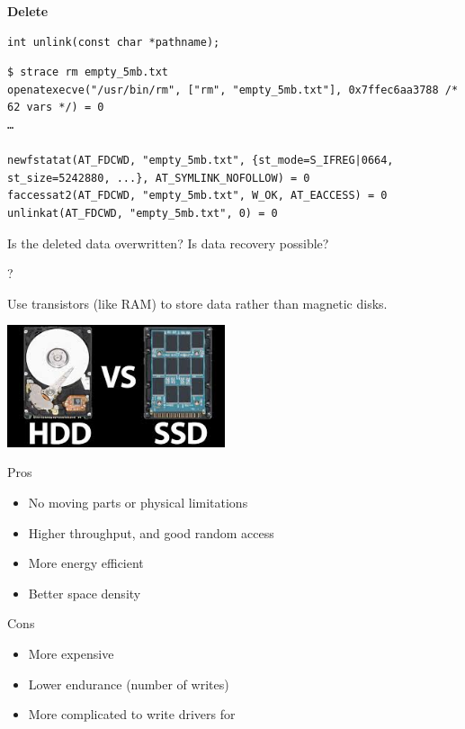 \begin{slide}


    \textbf{Delete}
    \begin{verbatim}
int unlink(const char *pathname);
    \end{verbatim}
	\medskip

	\begin{verbatim}
$ strace rm empty_5mb.txt
openatexecve("/usr/bin/rm", ["rm", "empty_5mb.txt"], 0x7ffec6aa3788 /* 62 vars */) = 0
…

newfstatat(AT_FDCWD, "empty_5mb.txt", {st_mode=S_IFREG|0664, st_size=5242880, ...}, AT_SYMLINK_NOFOLLOW) = 0
faccessat2(AT_FDCWD, "empty_5mb.txt", W_OK, AT_EACCESS) = 0
unlinkat(AT_FDCWD, "empty_5mb.txt", 0) = 0
	\end{verbatim}

    \bigskip
    Is the deleted data overwritten?
    Is data recovery possible?
\end{slide}

\begin{slide}
    ?

    Use transistors (like RAM) to store data rather than magnetic disks.
    \bigskip

    \includegraphics[width=64mm]{ssd-hdd.jpg}

\end{slide}

\begin{slide}
  

    Pros
    \begin{itemize}
        \item No moving parts or physical limitations
        \item Higher throughput, and good random access
        \item More energy efficient
        \item Better space density
    \end{itemize}
    \medskip

    Cons
    \begin{itemize}
        \item More expensive
        \item Lower endurance (number of writes)
        \item More complicated to write drivers for
    \end{itemize}

\end{slide}

